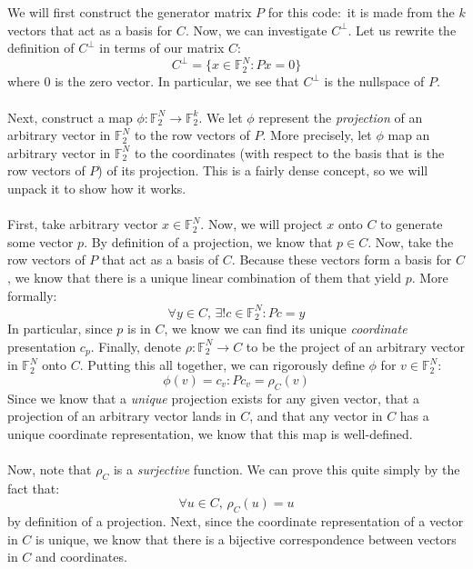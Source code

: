 \documentclass[letterpaper]{article}
\begin{document}
\section{}
\label{sec:Question2}

We will first construct the generator matrix $ P $ for this code:\ it is made from the $ k $ vectors that act as a basis for $ C $.
Now, we can investigate $ C^{\perp} $.
Let us rewrite the definition of $ C^{\perp} $ in terms of our matrix $ C $:
\[
C^{\perp} = \{ x \in \mathbb{F}_2^N : Px = 0 \}
\]
where $ 0 $ is the zero vector.
In particular, we see that $ C^{\perp} $ is the nullspace of $ P $.
\\ \\
Next, construct a map $ \phi : \mathbb{F}_2^N \to \mathbb{F}_2^k $.
We let $ \phi $ represent the \textit{projection} of an arbitrary vector in $ \mathbb{F}_2^N $ to the row vectors of $ P $.
More precisely, let $ \phi $ map an arbitrary vector in $ \mathbb{F}_2^N $ to the coordinates (with respect to the basis that is the row vectors of $ P $) of its projection.
This is a fairly dense concept, so we will unpack it to show how it works.
\\ \\
First, take arbitrary vector $ x \in \mathbb{F}_2^N $.
Now, we will project $ x $ onto $ C $ to generate some vector $ p $.
By definition of a projection, we know that $ p \in C $.
Now, take the row vectors of $ P $ that act as a basis of $ C $.
Because these vectors form a basis for $ C $, we know that there is a unique linear combination of them that yield $ p $.
More formally:
\[
\forall y \in C, \, \exists !c \in \mathbb{F}_2^N : Pc = y
\]
In particular, since $ p $ is in $ C $, we know we can find its unique \textit{coordinate} presentation $ c_p $.
Finally, denote $ \rho : \mathbb{F}_2^N \to C $ to be the project of an arbitrary vector in $ \mathbb{F}_2^N $ onto $ C $.
Putting this all together, we can rigorously define $ \phi $ for $ v \in \mathbb{F}_2^N $:
\[
\phi(v) = c_v : Pc_v = \rho_C(v)
\]
Since we know that a \textit{unique} projection exists for any given vector, that a projection of an arbitrary vector lands in $ C $, and that any vector in $ C $ has a unique coordinate representation, we know that this map is well-defined.
\\ \\
Now, note that $ \rho_C $ is a \textit{surjective} function.
We can prove this quite simply by the fact that:
\[
\forall u \in C, \, \rho_C(u) = u
\]
by definition of a projection.
Next, since the coordinate representation of a vector in $ C $ is unique, we know that there is a bijective correspondence between vectors in $ C $ and coordinates.
\end{document}
